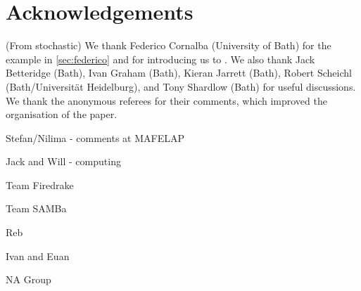 \section*{Acknowledgements}
(From stochastic)
We thank Federico Cornalba (University of Bath) for the example in \cref{sec:federico} and for introducing us to \cite{Si:86}. We also thank Jack Betteridge (Bath), Ivan Graham (Bath),  Kieran Jarrett (Bath), Robert Scheichl (Bath/Universit\"at Heidelburg), and Tony Shardlow (Bath) for useful discussions. We thank the anonymous referees for their comments, which improved the organisation of the paper.


Stefan/Nilima - comments at MAFELAP

Jack and Will - computing

Team Firedrake

Team SAMBa

Reb

Ivan and Euan

NA Group

